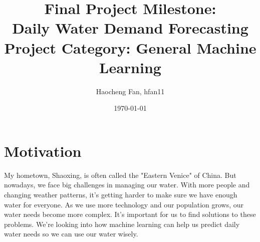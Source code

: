 \documentclass[12pt]{article}
\title{
    \textbf{Final Project Milestone: \\Daily Water Demand Forecasting} \\
    \vspace{0.5em}
    \large Project Category: General Machine Learning
}
\author{
    Haocheng Fan, hfan11 \\
}
\date{\today}
\begin{document}
\maketitle

\section*{Motivation}
My hometown, Shaoxing, is often called the "Eastern Venice" of China. But nowadays, we face big challenges in managing our water. With more people and changing weather patterns, 
it's getting harder to make sure we have enough water for everyone. As we use more technology and our population grows, our water needs become more complex. It's important for us to 
find solutions to these problems. We're looking into how machine learning can help us predict daily water needs so we can use our water wisely.
\end{document}
